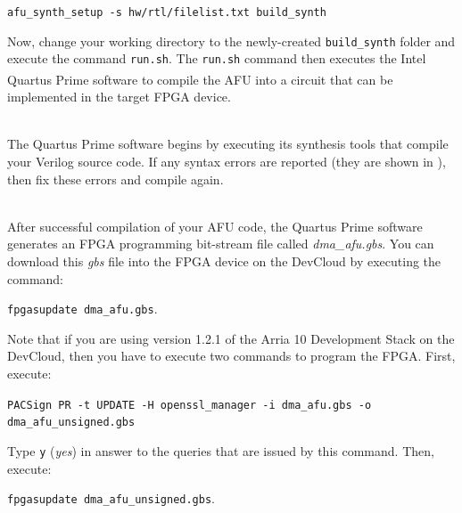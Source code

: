 \documentclass[11pt, twoside, pdftex]{article}
\newcommand{\red}[1]{{\color{red}\sf{#1}}}
\begin{document}
\begin{enumerate}
\noindent
\begin{center}
\texttt{afu\_synth\_setup -s hw/rtl/filelist.txt build\_synth}
\end{center}

Now, change your working directory to the newly-created \texttt{build\_synth} folder and 
execute the command \texttt{run.sh}. 
The \texttt{run.sh} command then executes the Intel 
Quartus\textsuperscript{\textregistered} Prime software to compile the AFU into a circuit
that can be implemented in the target FPGA device.

~\\
\noindent
The Quartus Prime software begins by executing its synthesis tools that
compile your Verilog source code. If any syntax errors are reported (they are shown in 
\red{red}), then fix these errors and compile again. 

~\\
\noindent
After successful compilation of your AFU code, the Quartus Prime software generates an FPGA 
programming bit-stream file called {\it dma\_afu.gbs}. You can download this {\it gbs} file into the FPGA device on the DevCloud by executing the command:

\noindent
\begin{center}
\texttt{fpgasupdate dma\_afu.gbs}.
\end{center}

Note that if you are using version 1.2.1 of the Arria 10 Development Stack on the
DevCloud, then you have to execute two commands to program the FPGA. First, execute:

\noindent
\begin{center}
\texttt{PACSign PR -t UPDATE -H openssl\_manager -i dma\_afu.gbs -o dma\_afu\_unsigned.gbs}
\end{center}

\noindent Type \texttt{y} ({\it yes}) in answer to the queries that are issued by this command. 
Then, execute:

\noindent
\begin{center}
\texttt{fpgasupdate dma\_afu\_unsigned.gbs}.
\end{center}

\end{enumerate}
\end{document}
